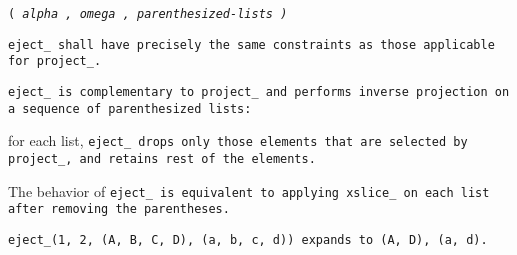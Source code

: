 
 \tt{(} \it{alpha} \tt{,} \it{omega} \tt{,} \it{parenthesized-lists} \tt{)}


\tt{eject_} shall have precisely the same
constraints as those applicable for \tt{project_}.


\tt{eject_} is complementary to \tt{project_} and performs
inverse projection on a sequence of parenthesized lists:

\noindent for each list, \tt{eject_} drops only those elements that
are selected by \tt{project_}, and retains rest of the elements.

\note The behavior of \tt{eject_} is equivalent to applying
\tt{xslice_} on each list after removing the parentheses.

\example \tt{eject_(1, 2, (A, B, C, D), (a, b, c, d))}
expands to \tt{(A, D), (a, d)}.
